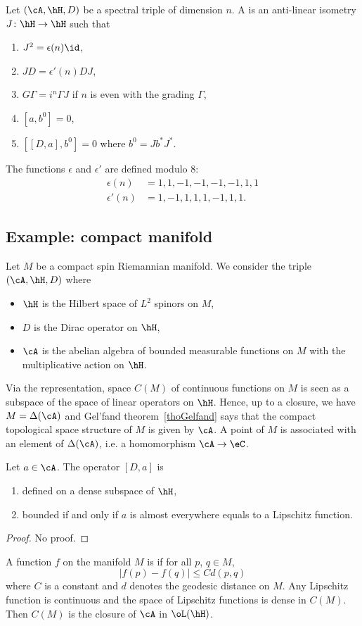 Let $(\cA,\hH,D)$ be a spectral triple of dimension $n$. A  is an anti-linear isometry $J\colon \hH\to \hH$ such that
\begin{enumerate}
\item $J^2=\epsilon(n)\id$,
\item $JD=\epsilon'(n)DJ$,
\item $G\Gamma=i^n\Gamma J$ if $n$ is even with the grading $\Gamma$,
\item $[a,b^0]=0$,
\item $[ [D,a],b^0 ]=0$ where $b^0=Jb^*J^*$.
\end{enumerate}
The functions $\epsilon$ and $\epsilon'$ are defined modulo $8$:
\[
\begin{split}
\epsilon(n)&=1,1,-1,-1,-1,-1,1,1\\
\epsilon'(n)&=1,-1,1,1,1,-1,1,1.
\end{split}
\]

\subsection{Example: compact manifold}

Let $M$ be a compact spin Riemannian manifold. We consider the triple $(\cA,\hH,D)$ where
\begin{itemize}
\item $\hH$ is the Hilbert space of $L^2$ spinors on $M$,
\item $D$ is the Dirac operator on $\hH$,
\item $\cA$ is the abelian algebra of bounded measurable functions on $M$ with the multiplicative action on $\hH$.
\end{itemize}
Via the representation, space $C(M)$ of continuous functions on $M$ is seen as a subspace of the space of linear operators on $\hH$. Hence, up to a closure, we have $M=\Delta(\cA)$ and Gel'fand theorem~\ref{thoGelfand} says that the compact topological space structure of $M$ is given by $\cA$. A point of $M$ is associated with an element of $\Delta(\cA)$, i.e. a homomorphism $\cA\to\eC$.

\begin{proposition}
Let $a\in\cA$. The operator $[D,a]$ is
\begin{enumerate}
\item defined on a dense subspace of $\hH$,
\item bounded if and only if $a$ is almost everywhere equals to a Lipschitz function.
\end{enumerate}

\end{proposition}
\begin{proof}
No proof.
\end{proof}

A function $f$ on the manifold $M$ is  if for all $p$, $q\in M$,
\[
  | f(p)-f(q) |\leq C d(p,q)
\]
where $C$ is a constant and $d$ denotes the geodesic distance on $M$. Any Lipschitz function is continuous and the space of Lipschitz functions is dense in $C(M)$. Then $C(M)$ is the closure of $\cA$ in $\oL(\hH)$.
